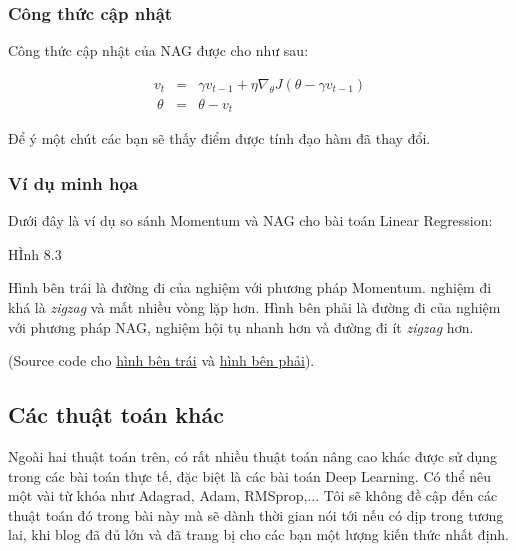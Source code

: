  
\subsubsection{Công thức cập nhật}
 
Công thức cập nhật của NAG được cho như sau: 
 
\begin{eqnarray} 
v_{t} &=& \gamma v_{t-1} + \eta \nabla_{\theta}J(\theta - \gamma v_{t-1}) \\\ 
\theta &=& \theta -  v_{t} 
\end{eqnarray} 
 
Để ý một chút các bạn sẽ thấy điểm được tính đạo hàm đã thay đổi.  
 
 
\subsubsection{Ví dụ minh họa }
 
Dưới đây là ví dụ so sánh Momentum và NAG cho bài toán Linear Regression: 
 
{\color{red} HÌnh 8.3} 
 
Hình bên trái là đường đi của nghiệm với phương pháp Momentum. nghiệm đi khá là \textit{zigzag} và mất nhiều vòng lặp hơn. Hình bên phải là đường đi của nghiệm với phương pháp NAG, nghiệm hội tụ nhanh hơn và đường đi ít \textit{zigzag} hơn.  
 
(Source code cho \href{https://github.com/tiepvupsu/tiepvupsu.github.io/blob/master/assets/GD/LR%20Momentum.ipynb}{hình bên trái} và \href{https://github.com/tiepvupsu/tiepvupsu.github.io/blob/master/assets/GD/LR%20NAG.ipynb}{ hình bên phải}). 
 
 
\subsection{Các thuật toán khác}
Ngoài hai thuật toán trên, có rất nhiều thuật toán nâng cao khác được sử dụng trong các bài toán thực tế, đặc biệt là các bài toán Deep Learning. Có thể nêu một vài từ khóa như Adagrad, Adam, RMSprop,... Tôi sẽ không đề cập đến các thuật toán đó trong bài này mà sẽ dành thời gian nói tới nếu có dịp trong tương lai, khi blog đã đủ lớn và đã trang bị cho các bạn một lượng kiến thức nhất định.  
 
